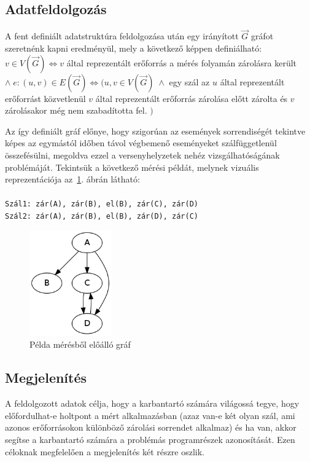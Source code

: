     \subsection{Adatfeldolgozás}
    A fent definiált adatstruktúra feldolgozása után egy irányított $\overrightarrow{G}$ gráfot szeretnénk kapni eredményül, mely a következő képpen definiálható: $v \in V(\overrightarrow{G}) \Leftrightarrow v$ által reprezentált erőforrás a mérés folyamán zárolásra került $ \wedge \; e : (u, v) \in E(\overrightarrow{G}) \Leftrightarrow (u, v \in V(\overrightarrow{G}) \; \wedge $ egy szál az $u$ által reprezentált erőforrást közvetlenül $v$ által reprezentált erőforrás zárolása előtt zárolta és $v$ zárolásakor még nem szabadította fel. $)$
    
    Az így definiált gráf előnye, hogy szigorúan az események sorrendiségét tekintve képes az egymástól időben távol végbemenő eseményeket szálfüggetlenül összefésülni, megoldva ezzel a versenyhelyzetek nehéz vizsgálhatóságának problémáját. Tekintsük a következő mérési példát, melynek vizuális reprezentációja az~\ref{fig:g1}. ábrán látható: \\ \\
\texttt{Szál1: zár(A), zár(B), el(B), zár(C), zár(D) \\
Szál2: zár(A), zár(B), el(B), zár(D), zár(C) \\
}

\begin{figure}[h!]
  \centering
    \includegraphics[width=1.4in]{figures/g1}
  \caption{Példa mérésből előálló gráf}
  \label{fig:g1}
\end{figure}
    
    \subsection{Megjelenítés}
    A feldolgozott adatok célja, hogy a karbantartó számára világossá tegye, hogy előfordulhat-e holtpont a mért alkalmazásban (azaz van-e két olyan szál, ami azonos erőforrásokon különböző zárolási sorrendet alkalmaz) és ha van, akkor segítse a karbantartó számára a problémás programrészek azonosítását. Ezen céloknak megfelelően a megjelenítés két részre oszlik.
    

